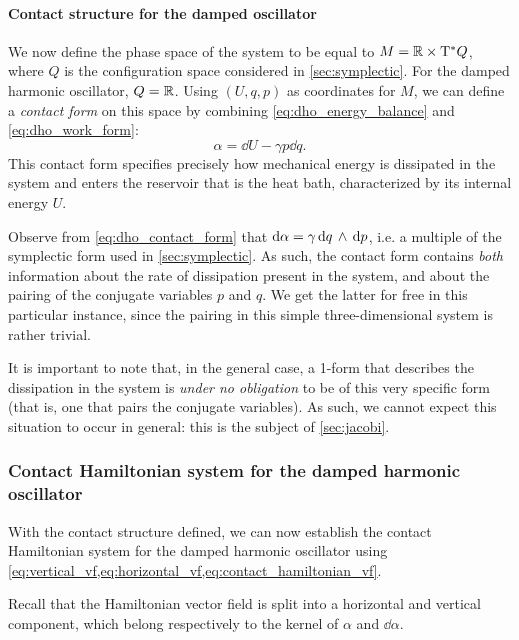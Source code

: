 \paragraph{Contact structure for the damped oscillator} We now define the phase space of the system to be equal to \(M = \mathbb{R} \times \mathrm{T}^*Q\), where \(Q\) is the configuration space considered in \cref{sec:symplectic}. For the damped harmonic oscillator, \(Q = \mathbb{R}\). Using $(U, q, p)$ as coordinates for $M$, we can define a \emph{contact form} on this space by combining \cref{eq:dho_energy_balance} and \cref{eq:dho_work_form}: 
\begin{equation}
    \alpha = \dd{U} - \gamma p \dd{q}.
    \label{eq:dho_contact_form}
\end{equation}
This contact form specifies precisely how mechanical energy is dissipated in the system and enters the reservoir that is the heat bath, characterized by its internal energy \(U\).

Observe from \cref{eq:dho_contact_form} that \(\dd{\alpha} = \gamma  \dd{q}\,\wedge\,\dd{p} \), i.e. a multiple of the symplectic form used in \cref{sec:symplectic}. As such, the contact form contains \emph{both} information about the rate of dissipation present in the system, and about the pairing of the conjugate variables \(p\) and \(q\). We get the latter for free in this particular instance, since the pairing in this simple three-dimensional system is rather trivial.

It is important to note that, in the general case, a 1-form that describes the dissipation in the system is \emph{under no obligation} to be of this very specific form (that is, one that pairs the conjugate variables). As such, we cannot expect this situation to occur in general: this is the subject of \cref{sec:jacobi}.

\subsubsection{Contact Hamiltonian system for the damped harmonic oscillator}
With the contact structure defined, we can now establish the contact Hamiltonian system for the damped harmonic oscillator using \cref{eq:vertical_vf,eq:horizontal_vf,eq:contact_hamiltonian_vf}.

Recall that the Hamiltonian vector field is split into a horizontal and vertical component, which belong respectively to the kernel of \(\alpha\) and \(\dd{\alpha}\).

